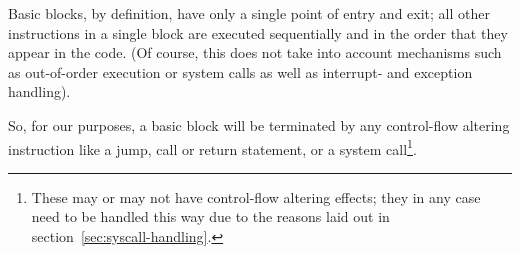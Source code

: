 Basic blocks, by definition, have only a single point of entry and exit;
all other instructions in a single block are executed sequentially and in the order that they appear in the code.
(Of course, this does not take into account mechanisms such as out-of-order execution or system calls as well as interrupt- and exception handling).

So, for our purposes, a basic block will be terminated by any control-flow altering instruction like a jump, call or return statement, or a system call\footnote{These may or may not have control-flow altering effects; they in any case need to be handled this way due to the reasons laid out in section~\ref{sec:syscall-handling}.}.








